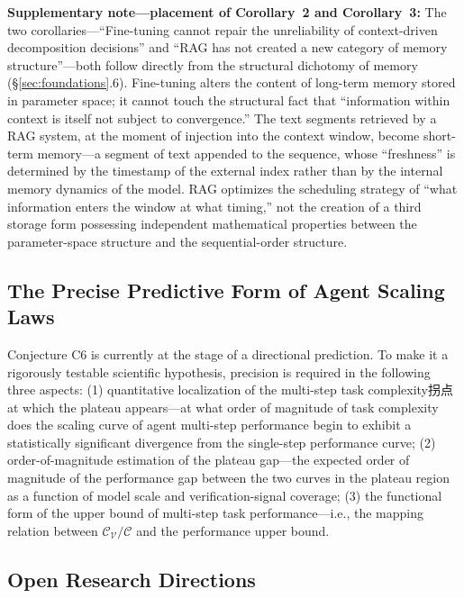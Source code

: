 \documentclass[11pt,a4paper]{article}
\theoremstyle{definition}
\newcommand{\verifspace}{\mathcal{C}_{\mathcal{V}}}
\newcommand{\taskcspace}{\mathcal{C}}
\begin{document}
\textbf{Supplementary note---placement of Corollary~2 and Corollary~3:} The two corollaries---``Fine-tuning cannot repair the unreliability of context-driven decomposition decisions'' and ``RAG has not created a new category of memory structure''---both follow directly from the structural dichotomy of memory (\S\ref{sec:foundations}.6). Fine-tuning alters the content of long-term memory stored in parameter space; it cannot touch the structural fact that ``information within context is itself not subject to convergence.'' The text segments retrieved by a RAG system, at the moment of injection into the context window, become short-term memory---a segment of text appended to the sequence, whose ``freshness'' is determined by the timestamp of the external index rather than by the internal memory dynamics of the model. RAG optimizes the scheduling strategy of ``what information enters the window at what timing,'' not the creation of a third storage form possessing independent mathematical properties between the parameter-space structure and the sequential-order structure.

\subsection{The Precise Predictive Form of Agent Scaling Laws}

Conjecture C6 is currently at the stage of a directional prediction. To make it a rigorously testable scientific hypothesis, precision is required in the following three aspects: (1) quantitative localization of the multi-step task complexity拐点 at which the plateau appears---at what order of magnitude of task complexity does the scaling curve of agent multi-step performance begin to exhibit a statistically significant divergence from the single-step performance curve; (2) order-of-magnitude estimation of the plateau gap---the expected order of magnitude of the performance gap between the two curves in the plateau region as a function of model scale and verification-signal coverage; (3) the functional form of the upper bound of multi-step task performance---i.e., the mapping relation between $\verifspace/\taskcspace$ and the performance upper bound.

\subsection{Open Research Directions}
\end{document}
